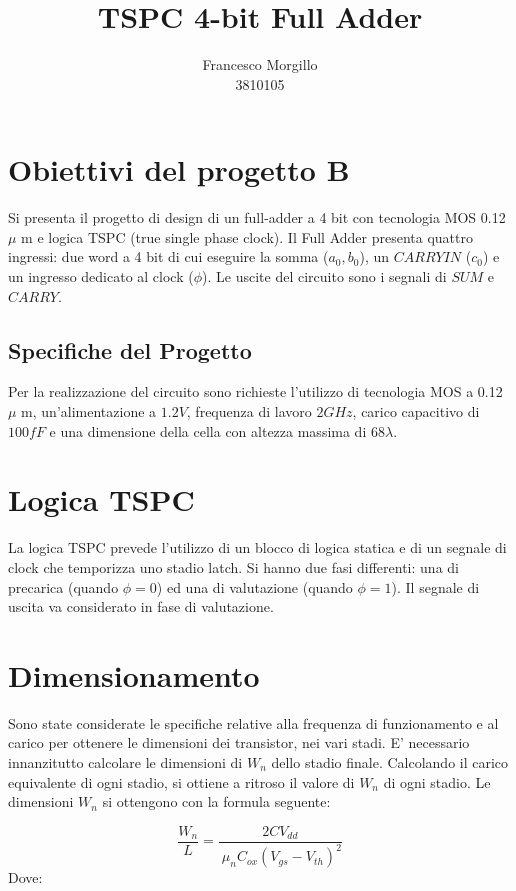 \documentclass[11pt]{article} %
\title{TSPC 4-bit Full Adder}
\author{Francesco Morgillo\\3810105}
\begin{document}
\maketitle

\section{Obiettivi del progetto B}
Si presenta il progetto di design di un full-adder a 4 bit con tecnologia MOS 0.12 $\mu$ m e logica TSPC (true single phase clock). 
Il Full Adder presenta quattro ingressi: due word a 4 bit di cui eseguire la somma ($a_{0},b_{0}$), un $CARRY IN$ ($ c_{0}$) e un ingresso dedicato al clock ($\phi$).
Le uscite del circuito sono i segnali di $SUM$ e $CARRY$.
\subsection{Specifiche del Progetto}
Per la realizzazione del circuito sono richieste l'utilizzo di tecnologia MOS a 0.12 $\mu$ m, un'alimentazione a $1.2V$, frequenza di lavoro $2GHz$,  carico capacitivo di $100fF$ e una dimensione della cella con altezza massima di 68$\lambda$.

\section{Logica TSPC}
La logica TSPC prevede l'utilizzo di un blocco di logica statica e di un segnale di clock che temporizza uno stadio latch. Si hanno due fasi differenti: una di precarica (quando $\phi=0$) ed una di valutazione (quando $\phi=1$). Il segnale di uscita va considerato in fase di valutazione.
\clearpage
\section{Dimensionamento}
Sono state considerate le specifiche relative alla frequenza di funzionamento e al carico per ottenere le dimensioni dei transistor, nei vari stadi.  
E' necessario innanzitutto calcolare le dimensioni di $W_{n}$ dello stadio finale. Calcolando il carico equivalente di ogni stadio, si ottiene a ritroso il valore di $W_{n}$ di ogni stadio.
Le dimensioni $W_{n}$ si ottengono con la formula seguente:

\begin{equation} 
\frac{W_{n}}{L}=\frac{2CV_{dd}}{\
 \mu_{n}C_{ox}(V_{gs}-V_{th})^2}
\end{equation}
Dove:\mbox{}\\
\end{document}
